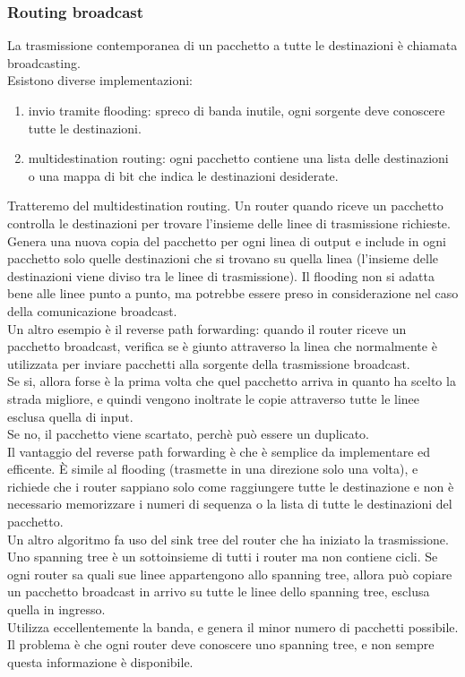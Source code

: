\documentclass{article}
\begin{document}
\subsubsection{Routing broadcast}
La trasmissione contemporanea di un pacchetto a tutte le destinazioni è chiamata broadcasting. \\
Esistono diverse implementazioni:
\begin{enumerate}
    \item invio tramite flooding: spreco di banda inutile, ogni sorgente deve conoscere tutte le destinazioni.
    \item multidestination routing: ogni pacchetto contiene una lista delle destinazioni o una mappa di bit che indica le destinazioni desiderate. 
\end{enumerate}
Tratteremo del multidestination routing. Un router quando riceve un pacchetto controlla le destinazioni per trovare l'insieme delle linee di trasmissione richieste.  Genera una nuova copia del pacchetto per ogni linea di output e include in ogni pacchetto solo quelle destinazioni che si trovano su quella linea (l'insieme delle destinazioni viene diviso tra le linee di trasmissione).
Il flooding non si adatta bene alle linee punto a punto, ma potrebbe essere preso in considerazione nel caso della comunicazione broadcast.\\
Un altro esempio è il reverse path forwarding: quando il router riceve un pacchetto broadcast, verifica se è giunto attraverso la linea che normalmente è utilizzata per inviare pacchetti alla sorgente della trasmissione broadcast.\\
Se si, allora forse è la prima volta che quel pacchetto arriva in quanto ha scelto la strada migliore, e quindi vengono inoltrate le copie attraverso tutte le linee esclusa quella di input.\\
Se no, il pacchetto viene scartato, perchè può essere un duplicato.\\
Il vantaggio del reverse path forwarding è che è semplice da implementare ed efficente. È simile al flooding (trasmette in una direzione solo una volta), e richiede che i router sappiano solo come raggiungere tutte le destinazione e non è necessario memorizzare i numeri di sequenza o la lista di tutte le destinazioni del pacchetto.\\
Un altro algoritmo fa uso del sink tree del router che ha iniziato la trasmissione. Uno spanning tree è un sottoinsieme di tutti i router ma non contiene cicli. Se ogni router sa quali sue linee appartengono allo spanning tree, allora può copiare un pacchetto broadcast in arrivo su tutte le linee dello spanning tree, esclusa quella in ingresso.\\
Utilizza eccellentemente la banda, e genera il minor numero di pacchetti possibile.\\
Il problema è che ogni router deve conoscere uno spanning tree, e non sempre questa informazione è disponibile.
\end{document}
